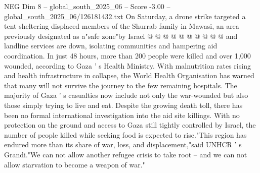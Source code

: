 \begin{textsample}{NEG Dim 8 – global\_south\_2025\_06 – Score -3.00 – global\_south\_2025\_06/126181432.txt}
On Saturday, a drone strike targeted a tent sheltering displaced members of the Shurrab family in Mawasi, an area previously designated as a"safe zone"by Israel @ @ @ @ @ @ @ @ @ @ and landline services are down, isolating communities and hampering aid coordination.
In just 48 hours, more than 200 people were killed and over 1,000 wounded, according to Gaza ' s Health Ministry.
With malnutrition rates rising and health infrastructure in collapse, the World Health Organisation has warned that many will not survive the journey to the few remaining hospitals.
The majority of Gaza ' s casualties now include not only the war-wounded but also those simply trying to live and eat.
Despite the growing death toll, there has been no formal international investigation into the aid site killings.
With no protection on the ground and access to Gaza still tightly controlled by Israel, the number of people killed while seeking food is expected to rise."This region has endured more than its share of war, loss, and displacement,"said UNHCR ' s Grandi."We can not allow another refugee crisis to take root -- and we can not allow starvation to become a weapon of war."

\end{textsample}
